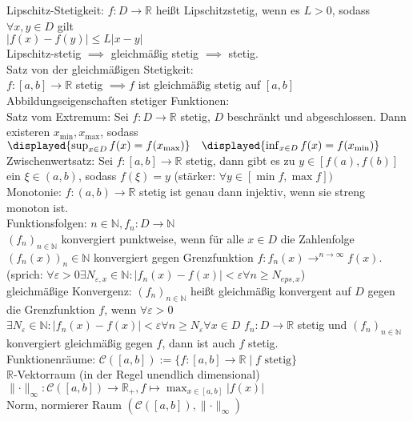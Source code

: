 \documentclass[9pt, landscape,a4paper]{extarticle}
\newcommand*\abs[1]{\lvert#1\rvert}
\newcommand*\norm[1]{\lVert#1\rVert}
\newcommand\eps{\varepsilon}
\begin{document}
\begin{multicols*}{4}
  Lipschitz-Stetigkeit: $f:D\to\mathbb{R}$ heißt Lipschitzstetig, wenn es $L > 0$, sodass $\forall x, y\in D$ gilt \\
  $\abs{f(x) - f(y)} \leq L\abs{x - y}$ \\
  Lipschitz-stetig $\implies$ gleichmäßig stetig $\implies$ stetig. \\
  Satz von der gleichmäßigen Stetigkeit: \\
  $f:[a,b] \to\mathbb{R}$ stetig $\implies f$ ist gleichmäßig stetig auf $[a,b]$
  Abbildungseigenschaften stetiger Funktionen: \\
  Satz vom Extremum: Sei $f: D\to\mathbb{R}$ stetig, $D$ beschränkt und abgeschlossen. Dann existeren $x_{\min}, x_{\max}$, sodass \\
  $\displayed{\sup_{x\in D} f(x) = f(x_{\max})} \quad \displayed{\inf_{x\in D} f(x) = f(x_{\min})}$ \\
  Zwischenwertsatz: Sei $f:[a,b] \to\mathbb{R}$ stetig, dann gibt es zu $y \in [f(a), f(b)]$ ein
  $\xi \in (a,b)$, sodass $f(\xi) = y$ (stärker: $\forall y \in [\min f, \max f])$ \\
  Monotonie: $f:(a,b) \to\mathbb{R}$ stetig ist genau dann injektiv, wenn sie streng monoton ist. \\
  Funktionsfolgen: $n\in \mathbb{N}, f_n: D\to\mathbb{N}$ \\
  $(f_n)_{n\in\mathbb{N}}$ konvergiert punktweise, wenn für alle $x\in D$ die Zahlenfolge $(f_n(x))_n\in\mathbb{N}$ konvergiert gegen Grenzfunktion $f: f_n(x) \to^{n\rightarrow \infty} f(x)$.
  (sprich: $\forall \eps > 0\exists N_{\eps,x} \in \mathbb{N}: \abs{f_n(x) - f(x)} < \eps \forall n\geq N_{eps,x}$) \\
  gleichmäßige Konvergenz: $(f_n)_{n\in\mathbb{N}}$ heißt gleichmäßig konvergent auf $D$ gegen die Grenzfunktion $f$, wenn $\forall \eps > 0$ \\
  $\exists N_\eps \in \mathbb{N}: \abs{f_n(x) - f(x)} < \eps \forall n\geq N_\eps \forall x\in D$
  $f_n: D\to\mathbb{R}$ stetig und $(f_n)_{n\in\mathbb{N}}$ konvergiert gleichmäßig gegen $f$, dann ist auch $f$ stetig. \\
  Funktionenräume: $\mathcal{C}([a,b]) := \{f:[a, b] \to \mathbb{R} \mid f\text{ stetig}\}$ \\
  $\mathbb{R}$-Vektorraum (in der Regel unendlich dimensional) \\
  $\norm{\cdot}_\infty: \mathcal{C}([a,b]) \to \mathbb{R}_+, f\mapsto \max_{x\in [a,b]}\abs{f(x)}$ \\
  Norm, normierer Raum $(\mathcal{C}([a,b]), \norm{\cdot}_\infty)$ \\

\end{multicols*}
\end{document}
